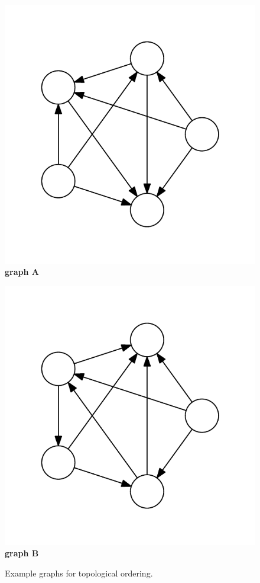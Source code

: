 \documentclass[a4paper]{article}
\begin{document}
\begin{figure}
  \centering
  \begin{minipage}{0.35\columnwidth}
    \centering
    \includegraphics[width=0.7\columnwidth,trim=1cm 1cm 1cm 1cm]{cycle-detection-dag.pdf}\\
    \textbf{graph A}
  \end{minipage}
  \begin{minipage}{0.35\columnwidth}
    \centering
    \includegraphics[width=0.7\columnwidth,trim=1cm 1cm 1cm 1cm]{cycle-detection-non-dag.pdf}\\
    \textbf{graph B}
  \end{minipage}
  \caption{Example graphs for topological ordering.}\label{fig:a3-graphs}
\end{figure}
\end{document}
